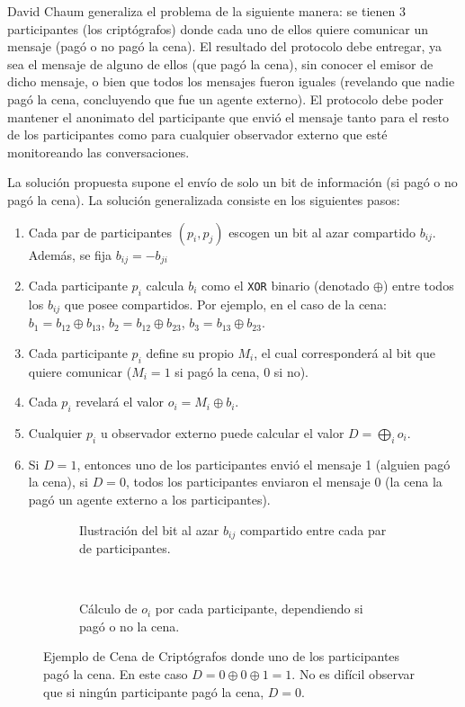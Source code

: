 David Chaum generaliza el problema de la siguiente manera: se tienen 3 participantes (los criptógrafos) donde cada uno de ellos quiere 
comunicar un mensaje (pagó o no pagó la cena). El resultado del protocolo debe entregar, ya sea el mensaje de alguno de ellos 
(que pagó la cena), sin conocer el emisor de dicho mensaje, o bien que todos los mensajes fueron iguales (revelando que nadie pagó la 
cena, concluyendo que fue un agente externo). El protocolo debe poder mantener el anonimato del participante que envió el mensaje 
tanto para el resto de los participantes como para cualquier observador externo que esté monitoreando las conversaciones.

La solución propuesta supone el envío de solo un bit de información (si pagó o no pagó la cena). 
La solución generalizada consiste en los siguientes pasos:
\begin{enumerate}
    \item Cada par de participantes $(p_i, p_j)$ escogen un bit al azar compartido $b_{ij}$. Además, se fija $b_{ij} = -b_{ji}$
    \item Cada participante $p_i$ calcula $b_i$ como el \texttt{XOR} binario (denotado $\oplus$) entre todos los $b_{ij}$ que posee 
    compartidos. Por ejemplo, en el caso de la cena: $b_1 = b_{12} \oplus b_{13}$, $b_2 = b_{12} \oplus b_{23}$, $b_3 = b_{13} \oplus b_{23}$.
    \item Cada participante $p_i$ define su propio $M_i$, el cual corresponderá al bit que quiere comunicar ($M_i = 1$ si pagó la cena, $0$ si no).
    \item Cada $p_i$ revelará el valor $o_i = M_i \oplus b_i$.
    \item Cualquier $p_i$ u observador externo puede calcular el valor $D = \displaystyle\bigoplus_i o_i$.
    \item Si $D = 1$, entonces uno de los participantes envió el mensaje 1 (alguien pagó la cena), si $D = 0$, todos los participantes 
    enviaron el mensaje 0 (la cena la pagó un agente externo a los participantes).
\end{enumerate}

\begin{figure}[H]
\centering
\begin{subfigure}[b]{0.4\textwidth}
    
    \caption{Ilustración del bit al azar $b_{ij}$ compartido entre cada par de participantes.}
    \label{2a}
\end{subfigure}
~
\begin{subfigure}[b]{0.4\textwidth}
    
    \caption{Cálculo de $o_i$ por cada participante, dependiendo si pagó o no la cena.}
    \label{2b}
\end{subfigure}

\protect\caption{Ejemplo de Cena de Criptógrafos donde uno de los participantes pagó la cena. En este caso $D = 0 \oplus 0 \oplus 1 = 1$. 
No es difícil observar que si ningún participante pagó la cena, $D = 0$. }
\label{fig:example_dcnet_chaum}
\end{figure}

